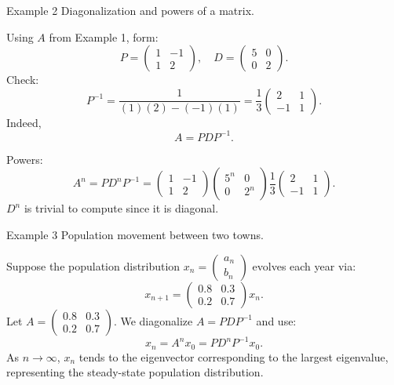 \documentclass[11pt]{article}
\def\textbf#1{#1}%
\def\mathbf#1{#1}%
\begin{document}
\textbf{Example 2}  
\textbf{Diagonalization and powers of a matrix.}  

Using $A$ from Example 1, form:
\[
P = \begin{pmatrix} 1 & -1 \\ 1 & 2 \end{pmatrix},
\quad
D = \begin{pmatrix} 5 & 0 \\ 0 & 2 \end{pmatrix}.
\]
Check:
\[
P^{-1} = \frac{1}{(1)(2) - (-1)(1)}
= \frac{1}{3} \begin{pmatrix} 2 & 1 \\ -1 & 1 \end{pmatrix}.
\]
Indeed,
\[
A = P D P^{-1}.
\]

\textbf{Powers:}
\[
A^n = P D^n P^{-1} 
= \begin{pmatrix} 1 & -1 \\ 1 & 2 \end{pmatrix}
\begin{pmatrix} 5^n & 0 \\ 0 & 2^n \end{pmatrix}
\frac{1}{3} \begin{pmatrix} 2 & 1 \\ -1 & 1 \end{pmatrix}.
\]
$D^n$ is trivial to compute since it is diagonal.


\textbf{Example 3}  
\textbf{Population movement between two towns.}  

Suppose the population distribution $\mathbf{x}_n = \begin{pmatrix} a_n \\ b_n \end{pmatrix}$ evolves each year via:
\[
\mathbf{x}_{n+1} = 
\begin{pmatrix} 0.8 & 0.3 \\ 0.2 & 0.7 \end{pmatrix} \mathbf{x}_n.
\]
Let $A = \begin{pmatrix} 0.8 & 0.3 \\ 0.2 & 0.7 \end{pmatrix}$.  
We diagonalize $A = P D P^{-1}$ and use:
\[
\mathbf{x}_n = A^n \mathbf{x}_0 = P D^n P^{-1} \mathbf{x}_0.
\]
As $n\to\infty$, $\mathbf{x}_n$ tends to the eigenvector corresponding to the largest eigenvalue, representing the steady-state population distribution.
\end{document}
